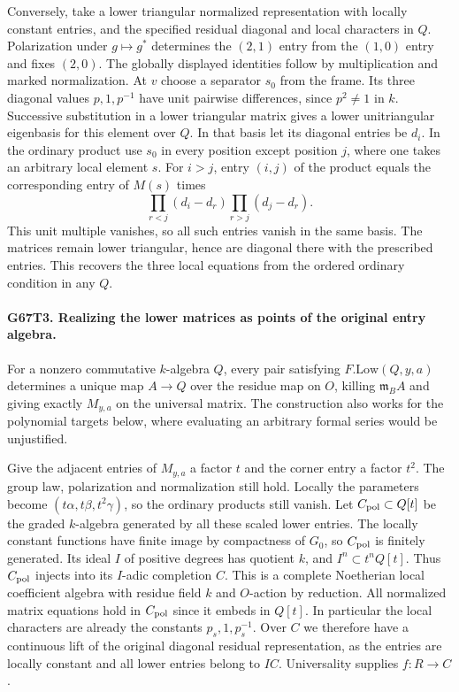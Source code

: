 Conversely, take a lower triangular normalized representation with
locally constant entries, and the specified residual diagonal and
local characters in $Q$. Polarization under $g\mapsto g^*$ determines
the $(2,1)$ entry from the $(1,0)$ entry and fixes $(2,0)$.
The globally displayed identities follow by multiplication and
marked normalization. At $v$ choose a separator $s_0$ from the
frame. Its three diagonal values $p,1,p^{-1}$ have unit pairwise
differences, since $p^2\ne1$ in $k$. Successive substitution in a
lower triangular matrix gives a lower unitriangular eigenbasis for
this element over $Q$. In that basis let its diagonal entries
be $d_i$. In the ordinary product use $s_0$ in every position except
position $j$, where one takes an arbitrary local element $s$.
For $i>j$, entry $(i,j)$ of the product equals the corresponding
entry of $M(s)$ times
\[
             \prod_{r<j}(d_i-d_r)\prod_{r>j}(d_j-d_r).
\]
This unit multiple vanishes, so all such entries vanish in the same
basis. The matrices remain lower triangular, hence are diagonal
there with the prescribed entries. This recovers the three local
equations from the ordered ordinary condition in any $Q$.

\paragraph{G67T3. Realizing the lower matrices as points of the original entry algebra.}
For a nonzero commutative $k$-algebra $Q$, every pair satisfying
$F.\mathrm{Low}(Q,y,a)$ determines a unique map $A\to Q$
over the residue map on $O$, killing $\mathfrak m_B A$ and
giving exactly $M_{y,a}$ on the universal matrix. The construction
also works for the polynomial targets below, where evaluating an
arbitrary formal series would be unjustified.

Give the adjacent entries of $M_{y,a}$ a factor $t$ and the corner
entry a factor $t^2$. The group law, polarization and normalization
still hold. Locally the parameters become
$(t\alpha,t\beta,t^2\gamma)$, so the ordinary products still vanish.
Let $C_{\rm pol}\subset Q[t]$ be the graded $k$-algebra generated by all
these scaled lower entries. The locally constant functions have
finite image by compactness of $G_0$, so $C_{\rm pol}$ is finitely generated.
Its ideal $I$ of positive degrees has quotient $k$, and
$I^n\subset t^nQ[t]$. Thus $C_{\rm pol}$ injects into its $I$-adic
completion $C$. This is a complete Noetherian local coefficient
algebra with residue field $k$ and $O$-action by reduction.
All normalized matrix equations hold in $C_{\rm pol}$ since it embeds
in $Q[t]$. In particular the local characters are already the
constants $p_s,1,p_s^{-1}$. Over $C$ we therefore have a continuous
lift of the original diagonal residual representation, as the
entries are locally constant and all lower entries belong to $IC$.
Universality supplies $f:R\to C$.

